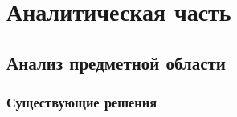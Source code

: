 \chapter{Аналитическая часть}

\begin{comment}
\section{ЧерновЯчок}

На рисунке \ref{img:worm} представлен Червячок (талисман этого курсача) для
повышения настрения при написании данной работы.

\img{5cm}{worm}{Просто червячок, чтобы не было грустно}{worm}

А дальше тут просто черновые записи, а то они сливаются.

\subsection{Про анализ области}

На специализированных сайтах ...

Каждый магазин представляет свои анонсы.

Как правило, анонс игротеки включает: 

Добавим туда ещё и организатора.

Предоставляется возможность регистрации через гугл формы. Необходимость
интеграции --- необходимость введения игрока.

Игротека проводится организатором (магазином) в каком-то месте (кафе, антикафе,
ресторане и тп). На ней представлена одна или несколько игр, в которые можно
поиграть. Часто организаторы предоставляют возможность покупки тех же игр прямо
на месте или возможность сделать заказ.

\textbf{\texttt{Анализ}} страниц сайтах об игротеках показал, что
\textbf{\texttt{обычно}} информация об игротеке включает дату, время начала,
продолжительность или время окончания, адрес проведения и стоимость участия.
Также представляется набор игр, по которым проводится игротека.

Информация об играх 
\end{comment}

\section{Анализ предметной области}

\subsection{Существующие решения}

